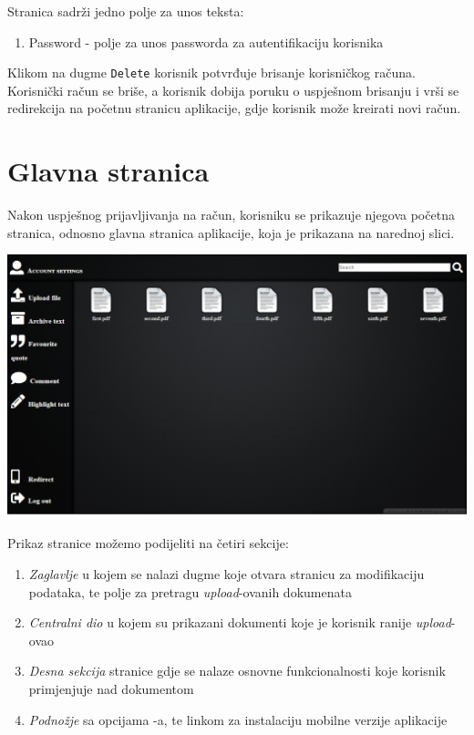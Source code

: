 Stranica sadrži jedno polje za unos teksta:
\begin{enumerate}
\item Password - polje za unos passworda za autentifikaciju korisnika
\end{enumerate}
Klikom na dugme \texttt{Delete} korisnik potvrđuje brisanje korisničkog računa. Korisnički račun se briše, a korisnik dobija poruku o uspješnom brisanju i vrši se redirekcija na početnu stranicu aplikacije, gdje korisnik može kreirati novi račun.

\newpage
\section{Glavna stranica}

Nakon uspješnog prijavljivanja na račun, korisniku se prikazuje njegova početna stranica, odnosno glavna stranica aplikacije, koja je prikazana na narednoj slici.

\begin{center}
    \includegraphics[scale=0.45]{images/Home.png}
\end{center}

Prikaz stranice možemo podijeliti na četiri sekcije: 
\begin{enumerate}
    \item \textit{Zaglavlje} u kojem se nalazi dugme koje otvara stranicu za modifikaciju podataka, te polje za pretragu \textit{upload}-ovanih dokumenata
    \item \textit{Centralni dio} u kojem su prikazani dokumenti koje je korisnik ranije \textit{upload}-ovao
    \item \textit{Desna sekcija} stranice gdje se nalaze osnovne funkcionalnosti koje korisnik primjenjuje nad dokumentom
    \item \textit{Podnožje} sa opcijama -a, te linkom za instalaciju mobilne verzije aplikacije
\end{enumerate}

